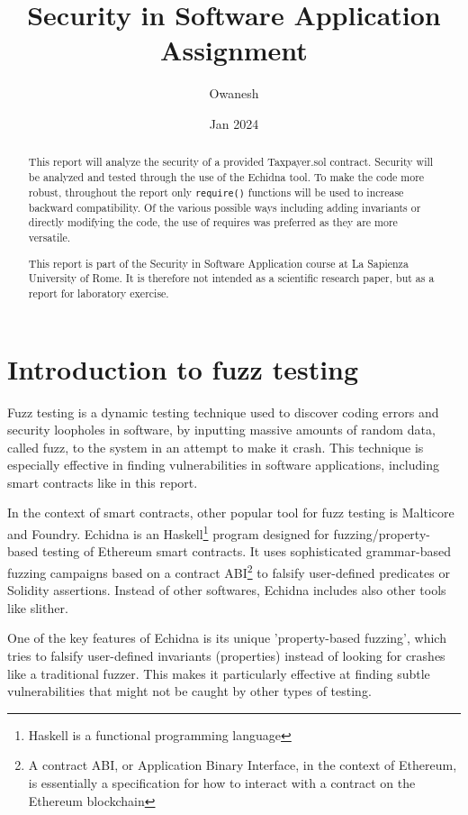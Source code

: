 \documentclass{article}
\title{Security in Software Application Assignment}
\author{Owanesh}
\date{Jan 2024}
\begin{document}
\maketitle

\begin{abstract}
    This report will analyze the security of a provided Taxpayer.sol 
    contract. Security will be analyzed and tested through the use of 
    the Echidna tool. To make the code more robust, throughout the report 
    only \texttt{require()} functions will be used to increase backward compatibility. Of the various possible ways including adding invariants or directly modifying the code, the use of requires was preferred as they are more versatile.

    This report is part of the Security in Software Application course at La Sapienza University of Rome. It is therefore not intended as a scientific research paper, but as a report for laboratory exercise.
\end{abstract}

\tableofcontents

\section{Introduction to fuzz testing}
Fuzz testing is a dynamic testing technique used to discover coding 
errors and security loopholes in software, by inputting massive amounts 
of random data, called fuzz, to the system in an attempt to make it crash. 
This technique is especially effective in finding vulnerabilities in 
software applications, including smart contracts like in this report.

In the context of smart contracts, other popular tool for 
fuzz testing is Malticore and Foundry. Echidna is an Haskell\footnote{Haskell is a functional programming language} program designed 
for fuzzing/property-based testing of Ethereum smart contracts. 
It uses sophisticated grammar-based fuzzing campaigns based 
on a contract ABI\footnote{A contract ABI, or Application Binary Interface, in the context of Ethereum, is essentially a specification for how to interact with a contract on the Ethereum blockchain} to falsify user-defined predicates or Solidity assertions.
Instead of other softwares, Echidna includes also other tools like slither.

One of the key features of Echidna is its unique 'property-based fuzzing',
 which tries to falsify user-defined invariants (properties) 
 instead of looking for crashes like a traditional fuzzer. 
 This makes it particularly effective at finding subtle vulnerabilities that might not be caught by other types of testing.
\end{document}
